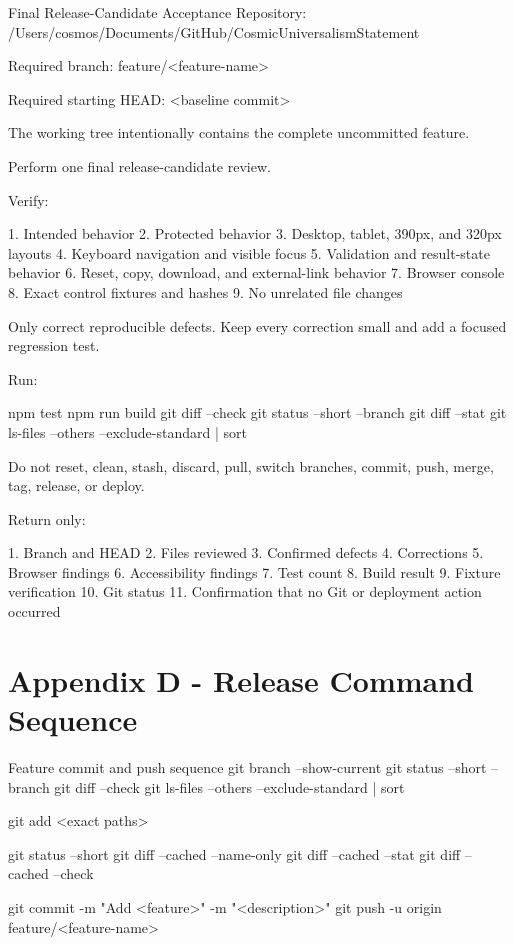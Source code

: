 \documentclass[11pt,letterpaper]{article}
\begin{document}
\begin{promptbox}{Final Release-Candidate Acceptance}
Repository:
/Users/cosmos/Documents/GitHub/CosmicUniversalismStatement

Required branch:
feature/<feature-name>

Required starting HEAD:
<baseline commit>

The working tree intentionally contains the complete uncommitted
feature.

Perform one final release-candidate review.

Verify:

1. Intended behavior
2. Protected behavior
3. Desktop, tablet, 390px, and 320px layouts
4. Keyboard navigation and visible focus
5. Validation and result-state behavior
6. Reset, copy, download, and external-link behavior
7. Browser console
8. Exact control fixtures and hashes
9. No unrelated file changes

Only correct reproducible defects.
Keep every correction small and add a focused regression test.

Run:

npm test
npm run build
git diff --check
git status --short --branch
git diff --stat
git ls-files --others --exclude-standard | sort

Do not reset, clean, stash, discard, pull, switch branches, commit,
push, merge, tag, release, or deploy.

Return only:

1. Branch and HEAD
2. Files reviewed
3. Confirmed defects
4. Corrections
5. Browser findings
6. Accessibility findings
7. Test count
8. Build result
9. Fixture verification
10. Git status
11. Confirmation that no Git or deployment action occurred
\end{promptbox}

\section{Appendix D - Release Command Sequence}

\begin{commandbox}{Feature commit and push sequence}
git branch --show-current
git status --short --branch
git diff --check
git ls-files --others --exclude-standard | sort

git add <exact paths>

git status --short
git diff --cached --name-only
git diff --cached --stat
git diff --cached --check

git commit -m "Add <feature>" -m "<description>"
git push -u origin feature/<feature-name>
\end{commandbox}
\end{document}
